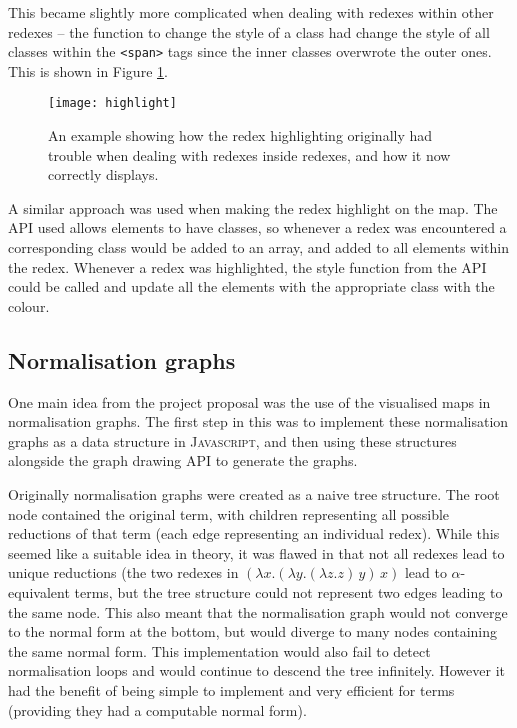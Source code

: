\documentclass[11pt]{article}
\begin{document}
This became slightly more complicated when dealing with redexes within other redexes -- the function to change the style of a class had change the style of all classes within the \texttt{<span>} tags since the inner classes overwrote the outer ones. This is shown in Figure \ref{fig:highlight}.

\begin{figure}
    \centering
    \texttt{[image: highlight]}
    \caption{An example showing how the redex highlighting originally had trouble when dealing with redexes inside redexes, and how it now correctly displays.}
    \label{fig:highlight}
\end{figure}

A similar approach was used when making the redex highlight on the map. The API used allows elements to have classes, so whenever a redex was encountered a corresponding class would be added to an array, and added to all elements within the redex. Whenever a redex was highlighted, the style function from the API could be called and update all the elements with the appropriate class with the colour.

\subsection{Normalisation graphs}
One main idea from the project proposal was the use of the visualised maps in normalisation graphs. The first step in this was to implement these normalisation graphs as a data structure in \textsc{Javascript}, and then using these structures alongside the graph drawing API to generate the graphs.

Originally normalisation graphs were created as a naive tree structure. The root node contained the original term, with children representing all possible reductions of that term (each edge representing an individual redex). While this seemed like a suitable idea in theory, it was flawed in that not all redexes lead to unique reductions (the two redexes in $(\lambda x. (\lambda y. (\lambda z. z) \, y) \, x)$ lead to $\alpha$-equivalent terms, but the tree structure could not represent two edges leading to the same node. This also meant that the normalisation graph would not converge to the normal form at the bottom, but would diverge to many nodes containing the same normal form. This implementation would also fail to detect normalisation loops and would continue to descend the tree infinitely. However it had the benefit of being simple to implement and very efficient for terms (providing they had a computable normal form).
\end{document}
